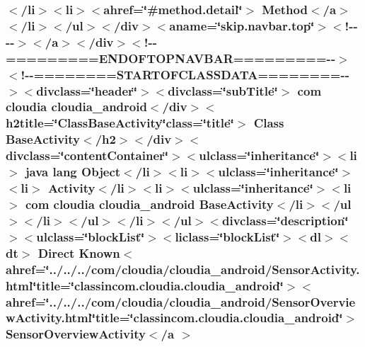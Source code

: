 \hypertarget{_base_activity_8html_aec8cf4843945e2d6c46ba25ac6a5a815}{
\subsubsection[{Sensor\-Overview\-Activity$<$/a $>$}]{\setlength{\rightskip}{0pt plus 5cm}$<$/li$>$$<$li$>$$<$ahref=\char`\"{}\#method.\-detail\char`\"{}$>$ Method$<$/{\bf a}$>$$<$/li$>$$<$/ul$>$$<$/div$>$$<$aname=\char`\"{}skip.\-navbar.\-top\char`\"{}$>$$<$!-\/-\/-\/-\/$>$$<$/a$>$$<$/div$>$$<$!-\/-\/=========E\-N\-D\-O\-F\-T\-O\-P\-N\-A\-V\-B\-A\-R=========-\/-\/$>$$<$!-\/-\/========S\-T\-A\-R\-T\-O\-F\-C\-L\-A\-S\-S\-D\-A\-T\-A========-\/-\/$>$$<$divclass=\char`\"{}header\char`\"{}$>$$<$divclass=\char`\"{}sub\-Title\char`\"{}$>$ com cloudia cloudia\-\_\-android$<$/div$>$$<$h2title=\char`\"{}Class\-Base\-Activity\char`\"{}class=\char`\"{}title\char`\"{}$>$ Class {\bf Base\-Activity}$<$/h2$>$$<$/div$>$$<$divclass=\char`\"{}content\-Container\char`\"{}$>$$<$ulclass=\char`\"{}inheritance\char`\"{}$>$$<$li$>$ java lang Object$<$/li$>$$<$li$>$$<$ulclass=\char`\"{}inheritance\char`\"{}$>$$<$li$>$ Activity$<$/li$>$$<$li$>$$<$ulclass=\char`\"{}inheritance\char`\"{}$>$$<$li$>$ com cloudia cloudia\-\_\-android {\bf Base\-Activity}$<$/li$>$$<$/ul$>$$<$/li$>$$<$/ul$>$$<$/li$>$$<$/ul$>$$<$divclass=\char`\"{}description\char`\"{}$>$$<$ulclass=\char`\"{}block\-List\char`\"{}$>$$<$liclass=\char`\"{}block\-List\char`\"{}$>$$<$dl$>$$<${\bf dt}$>$ Direct Known$<$ahref=\char`\"{}../../../com/cloudia/cloudia\-\_\-android/Sensor\-Activity.\-html\char`\"{}title=\char`\"{}classincom.\-cloudia.\-cloudia\-\_\-android\char`\"{}$>$$<$ahref=\char`\"{}../../../com/cloudia/cloudia\-\_\-android/Sensor\-Overview\-Activity.\-html\char`\"{}title=\char`\"{}classincom.\-cloudia.\-cloudia\-\_\-android\char`\"{}$>$ Sensor\-Overview\-Activity$<$/{\bf a} $>$}}\label{_base_activity_8html_aec8cf4843945e2d6c46ba25ac6a5a815}
